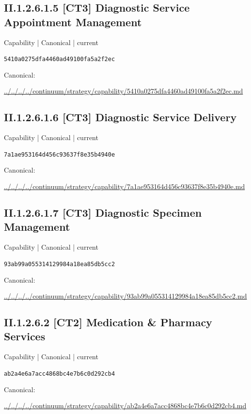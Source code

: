 \documentclass[10pt,a4paper]{article}
\begin{document}
\subsection*{II.1.2.6.1.5 [CT3] Diagnostic Service Appointment Management}
\label{element-5410a0275dfa4460ad49100fa5a2f2ec}
{\small Capability | Canonical | current}\par
\texttt{5410a0275dfa4460ad49100fa5a2f2ec}\par
Canonical: \par
{\footnotesize\url{../../../../continuum/strategy/capability/5410a0275dfa4460ad49100fa5a2f2ec.md}}\par
\subsection*{II.1.2.6.1.6 [CT3] Diagnostic Service Delivery}
\label{element-7a1ae953164d456c93637f8e35b4940e}
{\small Capability | Canonical | current}\par
\texttt{7a1ae953164d456c93637f8e35b4940e}\par
Canonical: \par
{\footnotesize\url{../../../../continuum/strategy/capability/7a1ae953164d456c93637f8e35b4940e.md}}\par
\subsection*{II.1.2.6.1.7 [CT3] Diagnostic Specimen Management}
\label{element-93ab99a055314129984a18ea85db5cc2}
{\small Capability | Canonical | current}\par
\texttt{93ab99a055314129984a18ea85db5cc2}\par
Canonical: \par
{\footnotesize\url{../../../../continuum/strategy/capability/93ab99a055314129984a18ea85db5cc2.md}}\par
\subsection*{II.1.2.6.2 [CT2] Medication \& Pharmacy Services}
\label{element-ab2a4e6a7acc4868bc4e7b6c0d292cb4}
{\small Capability | Canonical | current}\par
\texttt{ab2a4e6a7acc4868bc4e7b6c0d292cb4}\par
Canonical: \par
{\footnotesize\url{../../../../continuum/strategy/capability/ab2a4e6a7acc4868bc4e7b6c0d292cb4.md}}\par
\end{document}

